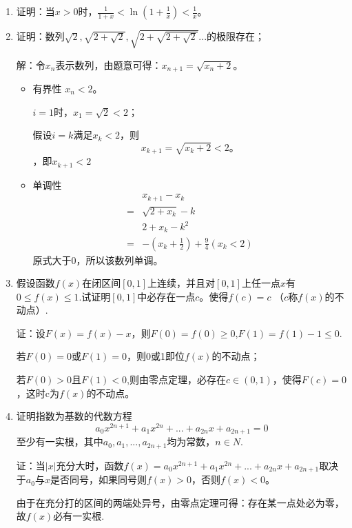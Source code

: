 \documentclass[UTF8]{ctexart}
\begin{document}
\begin{enumerate}
			\item 证明：当$x>0$时，$\frac{1}{1+x}<\ln(1+\frac{1}{x})<\frac{1}{x}$。
			
			\item 证明：数列$\sqrt2,\sqrt{2+\sqrt{2}},\sqrt{2+\sqrt{2+\sqrt{2}}}...$的极限存在；
			
			解：令$x_n$表示数列，由题意可得：$x_{n+1}=\sqrt{x_n+2}$。
			
			\begin{itemize}
				\item 有界性 $x_n<2$。
				
				$i=1$时，$x_1=\sqrt{2}<2$；
				
				假设$i=k$满足$x_k<2$，则
				$$
				x_{k+1}=\sqrt{x_{k}+2}<2。
				$$，即$x_{k+1}<2$
				
				\item 单调性 
				\begin{equation}
					\begin{split}
						 &x_{k+1}-x_k \\
						=&\sqrt{2+x_k}-k\\
						&2+x_k-k^2\\
						=&-(x_k+\frac{1}{2})+\frac{9}{4}(x_k<2)
					\end{split}
				\end{equation}
				原式大于$0$，所以该数列单调。
			\end{itemize}
			
			\item 假设函数$f(x)$在闭区间$[0,1]$上连续，并且对$[0,1]$上任一点$x$有
			$0\leq f(x)\leq 1$.试证明$[0,1]$中必存在一点$c$。使得$f(c)=c$
			（$c$称$f(x)$的不动点）.
			
			证：设$F(x)=f(x)-x$，则$F(0)=f(0)\geq 0$,$F(1)=f(1)-1\leq 0.$
			
			若$F(0)=0$或$F(1)=0$，则0或1即位$f(x)$的不动点；
			
			若$F(0)>0$且$F(1)<0$,则由零点定理，必存在$c\in(0,1)$，使得$F(c)=0$，这时c为$f(x)$的不动点。
			
			\item 证明指数为基数的代数方程
			$$
			a_0x^{2n+1}+a_1x^{2n}+...+a_{2n}x+a_{2n+1}=0
			$$
			至少有一实根，其中$a_0,a_1,...,a_{2n+1}$均为常数，$n\in N$.
			
			证：当$|x|$充分大时，函数$f(x)=a_0x^{2n+1}+a_1x^{2n}+...+a_{2n}x+a_{2n+1}$取决于$a_0$与$x$是否同号，如果同号则$f(x)>0$，否则$f(x)<0$。
			
			由于在充分打的区间的两端处异号，由零点定理可得：存在某一点处必为零，故$f(x)$必有一实根.


			\end{enumerate}
\end{document}
